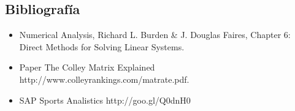 \subsection{Bibliografía}

\begin{itemize}
 \item Numerical Analysis, Richard L. Burden \& J. Douglas Faires, Chapter 6: Direct Methods for Solving Linear Systems.
 \item Paper The Colley Matrix Explained http://www.colleyrankings.com/matrate.pdf.
 \item SAP Sports Analistics http://goo.gl/Q0dnH0    
\end{itemize}
